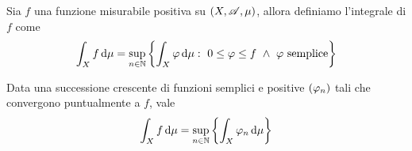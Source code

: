 \begin{definition}\label{def:IntegralePositive}
	Sia $f$ una funzione misurabile positiva su $(X,\mathscr A,\mu)$, allora definiamo l'integrale di $f$ come
	\begin{equation*}
		\int_Xf\,\mathrm d\mu=\sup_{n\in\mathbb N}\left\{\int_X\varphi\,\mathrm d \mu:\ 0\le \varphi\le f\ \wedge\ \varphi \text{ semplice}\right\}
	\end{equation*}
\end{definition}

\begin{proposition} \label{DefinizioneEquivalenteIntegralePositive}
	Data una successione crescente di funzioni semplici e positive $(\varphi_n)$ tali che convergono puntualmente a $f$, vale 
	\begin{equation*}
		\int_X f\,\mathrm d\mu=\sup_{n\in\mathbb N}\left\{\int_X\varphi_n\,\mathrm d\mu\right\}
	\end{equation*}
\end{proposition}
